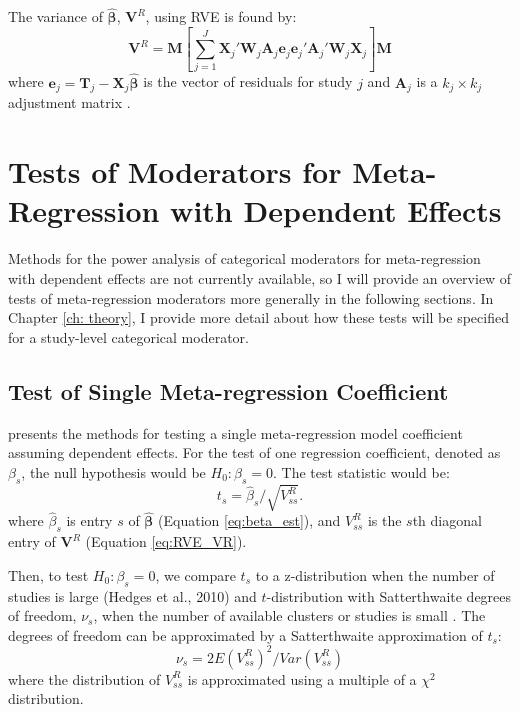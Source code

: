 The variance of $\bm{\hat{\beta}}$,  $\mathbf{V}^R$, using RVE  is found by:
\begin{equation}\label{eq:RVE_VR}
    \mathbf{V}^R = \mathbf{M}\left[ \sum_{j=1}^J \mathbf{X}_j' \mathbf{W}_j\mathbf{A}_j\mathbf{e}_j\mathbf{e}_j'\mathbf{A}_j'\mathbf{W}_j\mathbf{X}_j \right]\mathbf{M}
\end{equation}
where $\mathbf{e}_j = \mathbf{T}_j - \mathbf{X}_j\bm{\hat{\beta}}$ is the vector of residuals for study $j$ and $\mathbf{A}_j$ is a $k_j \times k_j$ adjustment matrix \autocite{tipton2015a,tipton2015b}.  


\section{Tests of Moderators for Meta-Regression with Dependent Effects }

Methods for the power analysis of categorical moderators for meta-regression with dependent effects are not currently available, so I will provide an overview of tests of meta-regression moderators more generally in the following sections. In Chapter \ref{ch: theory}, I provide more detail about how these tests will be specified for a study-level categorical moderator. 

\subsection{Test of Single Meta-regression Coefficient}

\textcite{tipton2015a} presents the methods for testing a single meta-regression model coefficient assuming dependent effects. For the test of one regression coefficient, denoted as $\beta_s$, the null hypothesis would be $H_0: \beta_s = 0$. The test statistic would be:
\begin{equation}
    t_s = \hat{\beta}_s/\sqrt{V^R_{ss}}. 
\end{equation}
where $\hat{\beta}_s$ is entry $s$ of $\bm{\hat{\beta}}$ (Equation \ref{eq:beta_est}), and $V^R_{ss}$ is the $s$th diagonal entry of $\mathbf{V}^R$ (Equation \ref{eq:RVE_VR}).

Then, to test  $H_0: \beta_s = 0$, we compare $t_s$ to a z-distribution when the number of studies is large (Hedges et al., 2010) and $t$-distribution with Satterthwaite degrees of freedom, $\nu_s$, when the number of available clusters or studies is small \autocite{tipton2015a}. The degrees of freedom can be approximated by a Satterthwaite approximation of $t_s$:
\begin{equation} \label{eq: satt formulation}
    \nu_s = 2E(V^R_{ss})^2 / Var(V^R_{ss})
\end{equation}
where the distribution of $V^R_{ss}$ is approximated using a multiple of a $\chi^2$ distribution. 

